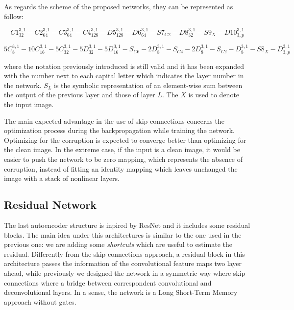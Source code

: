 \documentclass[12pt,a4paper]{article}
\begin{document}
As regards the scheme of the proposed networks, they can be represented as follow:

\begin{equation}
C1_{32}^{3,1} - C2_{64}^{3,1} - C3_{64}^{3,1} - C4_{128}^{3,1} - D5_{128}^{3,1} - D6_{64}^{3,1} - S7_{C2} - D8_{32}^{3,1} - S9_X - D10_{3,p}^{3,1} 
\end{equation}

\begin{equation}
5C_{8}^{3,1} - 10C_{16}^{3,1} - 5C_{32}^{3,1} - 5D_{32}^{3,1} - 5D_{16}^{3,1} - S_{C6} - 2D_{8}^{3,1} - S_{C4} - 2D_{8}^{3,1} - S_{C2} -D_{8}^{3,1} - S8_X - D_{3,p}^{3,1} 
\end{equation}

where the notation previously introduced is still valid and it has been expanded with the number next to each capital letter which indicates the layer number in the network. $S_{L}$ is the symbolic representation of an element-wise sum between the output of the previous layer and those of layer $L$. The $X$ is used to denote the input image. 

The main expected advantage in the use of skip connections concerns the optimization process during the backpropagation while training the network. Optimizing for the corruption is expected to converge better than optimizing for the clean image. In the extreme case, if the input is a clean image, it
would be easier to push the network to be zero mapping, which represents the absence of corruption, instead of fitting an identity mapping which leaves unchanged the image with a stack of nonlinear layers.

\subsection{Residual Network}
The last autoencoder structure is inpired by ResNet \cite{N&Al}\cite{H&X&R} and it includes some residual blocks. The main idea under this architectures is similar to the one used in the previous one: we are adding some \textit{shortcuts} which are useful to estimate the residual. Differently from the skip connections approach, a residual block in this architecture passes the information of the convolutional feature maps two layer ahead, while previously we designed the network in a symmetric way where skip connections where a bridge between correspondent convolutional and deconvolutional layers. In a sense, the network is a Long Short-Term Memory approach without gates. 
\end{document}
